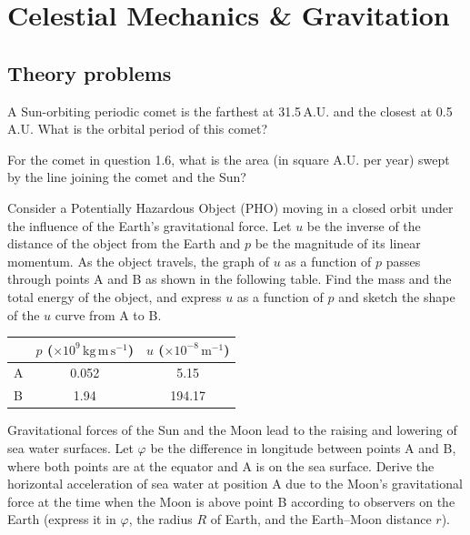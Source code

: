 \chapter{Celestial Mechanics \& Gravitation}

\section*{Theory problems}

A Sun-orbiting periodic comet is the farthest at 31.5\,A.U. and the closest at
0.5\,A.U. What is the orbital period of this comet?

For the comet in question 1.6, what is the area (in square A.U. per year) swept
by the line joining the comet and the Sun?

Consider a Potentially Hazardous Object (PHO) moving in a closed orbit under
the influence of the Earth's gravitational force. Let $u$ be the inverse of the
distance of the object from the Earth and $p$ be the magnitude of its linear
momentum. As the object travels, the graph of $u$ as a function of $p$ passes
through points A and B as shown in the following table. Find the mass and the
total energy of the object, and express $u$ as a function of $p$ and sketch the
shape of the $u$ curve from A to B.

\begin{center}
\begin{tabular}{lcc}
\toprule
 & $p$ ($\times 10^{9}$\,$\mathrm{kg\,m\,s^{-1}}$)
 & $u$ ($\times 10^{-8}$\,$\mathrm{m^{-1}}$) \\
\midrule
A & 0.052 & 5.15 \\
B & 1.94 & 194.17 \\
\bottomrule
\end{tabular}
\end{center}

Gravitational forces of the Sun and the Moon lead to the raising and lowering
of sea water surfaces. Let $\varphi$ be the difference in longitude between
points A and B, where both points are at the equator and A is on the sea
surface. Derive the horizontal acceleration of sea water at position A due to
the Moon's gravitational force at the time when the Moon is above point B
according to observers on the Earth (express it in $\varphi$, the radius $R$ of
Earth, and the Earth--Moon distance $r$).

